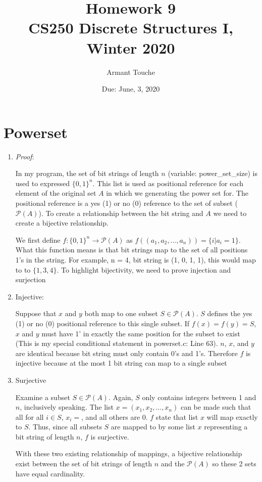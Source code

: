 \documentclass[11pt,a4paper]{article}
\title{\bf Homework 9\\[1ex]
\rm\normalsize CS250 Discrete Structures I, Winter 2020 }
\date{\normalsize Due: June, 3, 2020}
\author{\normalsize Armant Touche}
\begin{document}
 
\vspace{0cm}\maketitle 

\section{Powerset}
    
        \begin{enumerate}

        \item \textit{Proof}:

        In my program, the set of bit strings of length $n$ (variable: power\_set\_size) is used to expressed $\{0, 1\}^n$. This list is used as positional reference for each element of the original set $A$ in which we generating the power set for. The positional reference is a yes (1) or no (0) reference to the set of subset ($\mathcal{P}(A)$). To create a relationship between the bit string and $A$ we need to create a bijective relationship.

        We first define $f: \{0, 1\}^n\rightarrow \mathcal{P}(A)$ as $f((a_1, a_2,...,a_n)) = \{i|a_i = 1\}$. What this function means is that bit strings map to the set of all positions 1's in the string. For example, n = 4, bit string is (1, 0, 1, 1), this would map to to $\{1, 3, 4\}$. To highlight bijectivity, we need to prove injection and surjection

        \item Injective:

            Suppose that $x$ and $y$ both map to one subset $S\in \mathcal{P}(A)$. $S$ defines the yes (1) or no (0) positional reference to this single subset. If $f(x) = f(y) = S$, $x$ and $y$ must have 1' in exactly the same position for the subset to exist (This is my special conditional statement in powerset.c: Line 63). $n$, $x$, and $y$ are identical because bit string must only contain 0's and 1's. Therefore $f$ is injective because at the most 1 bit string can map to a single subset

        \item Surjective

        Examine a subset $S\in \mathcal{P}(A)$. Again, $S$ only contains integers between 1 and $n$, inclusively speaking. The list $x = (x_1, x_2,...,x_n)$ can be made such that all for all $i\in S$, $x_i = $, and all others are 0. $f$ state that list $x$ will map exactly to $S$. Thus, since all subsets $S$ are mapped to by some list $x$ representing a bit string of length $n$, $f$ is surjective.

        With these two existing relationship of mappings, a bijective relationship exist between the set of bit strings of length $n$ and the $\mathcal{P}(A)$ so these 2 sets have equal cardinality.

        \end{enumerate}



            
        
        
\end{document}
